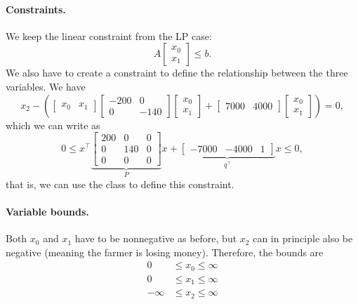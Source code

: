 \paragraph{Constraints.} We keep the linear constraint from the LP case:
\[
A \begin{bmatrix} x_0 \\ x_1 \end{bmatrix} \leq b.
\]
We also have to create a constraint to define the relationship between the three variables. We have
\[
x_2 - \left( \begin{bmatrix} x_0 & x_1 \end{bmatrix} \begin{bmatrix} -200 & 0 \\ 0 & -140 \end{bmatrix} \begin{bmatrix} x_0 \\ x_1 \end{bmatrix} + \begin{bmatrix} 7000 & 4000 \end{bmatrix} \begin{bmatrix} x_0 \\ x_1 \end{bmatrix} \right) = 0,
\]
which we can write as
\[
0 \leq x^\top \underbrace{\begin{bmatrix} 200 & 0 & 0 \\ 0 & 140 & 0 \\ 0 & 0 & 0 \end{bmatrix}}_P x+ \underbrace{\begin{bmatrix} -7000 & -4000 & 1 \end{bmatrix}}_{q^\top} x \leq 0,
\]
that is, we can use the  class to define this constraint.

\paragraph{Variable bounds.} Both $x_0$ and $x_1$ have to be nonnegative as before, but $x_2$ can in principle also be negative (meaning the farmer is losing money). Therefore, the bounds are
\begin{align*}
0 &\leq x_0 \leq \infty \\
0 &\leq x_1 \leq \infty \\
-\infty &\leq x_2 \leq \infty \\
\end{align*}

